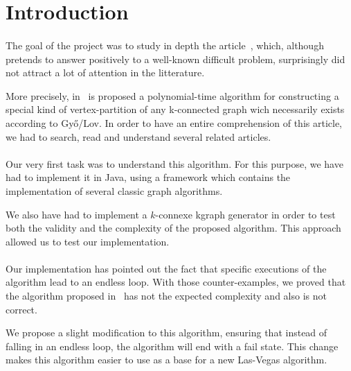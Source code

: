 \section{Introduction}
\paragraph{}
The goal of the project was to study in depth the article~\cite{JS94}, which,
although pretends to answer positively to a well-known difficult problem,
surprisingly did not attract a lot of attention in the litterature.

More precisely, in~\cite{JS94} is proposed a polynomial-time algorithm for
constructing a special kind of vertex-partition of any k-connected graph wich 
necessarily exists according to Gy{\H o}/Lov. %
In order to have an entire comprehension of this article, we had to search,
read and understand several related articles.

\paragraph{}
Our very first task was to understand this algorithm. For this purpose, we have 
had to implement it in Java, using a framework which contains the implementation
of several classic graph algorithms.

We also have had to implement a $k$-connexe kgraph generator in order to test both
the validity and the complexity of the proposed algorithm. This approach allowed
us to test our implementation.

\paragraph{}
Our implementation has pointed out the fact that specific executions of the
algorithm lead to an endless loop. With those counter-examples, we
proved that the algorithm proposed in~\cite{JS94} has not the expected
complexity and also is not correct.

We propose a slight modification to this algorithm, ensuring that instead of
falling in an endless loop, the algorithm will end with a fail state. This
change makes this algorithm easier to use as a base for a new Las-Vegas
algorithm.
